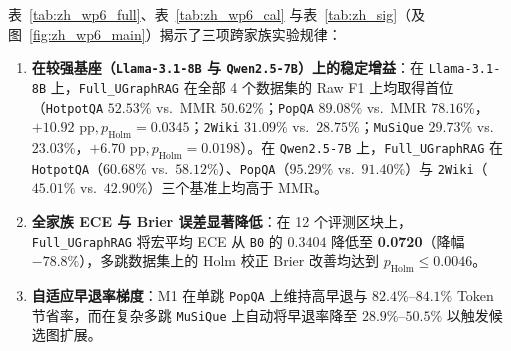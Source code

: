 \documentclass[11pt]{article}
\begin{document}
表~\ref{tab:zh_wp6_full}、表~\ref{tab:zh_wp6_cal} 与表~\ref{tab:zh_sig}（及图~\ref{fig:zh_wp6_main}）揭示了三项跨家族实验规律：
\begin{enumerate}[leftmargin=*,nosep]
    \item \textbf{在较强基座（\texttt{Llama-3.1-8B} 与 \texttt{Qwen2.5-7B}）上的稳定增益}：在 \texttt{Llama-3.1-8B} 上，\texttt{Full\_UGraphRAG} 在全部 4 个数据集的 Raw F1 上均取得首位（\texttt{HotpotQA} $52.53\%$ vs.\ MMR $50.62\%$；\texttt{PopQA} $89.08\%$ vs.\ MMR $78.16\%$，$+10.92\text{ pp}, p_{\text{Holm}}=0.0345$；\texttt{2Wiki} $31.09\%$ vs.\ $28.75\%$；\texttt{MuSiQue} $29.73\%$ vs.\ $23.03\%$，$+6.70\text{ pp}, p_{\text{Holm}}=0.0198$）。在 \texttt{Qwen2.5-7B} 上，\texttt{Full\_UGraphRAG} 在 \texttt{HotpotQA}（$60.68\%$ vs.\ $58.12\%$）、\texttt{PopQA}（$95.29\%$ vs.\ $91.40\%$）与 \texttt{2Wiki}（$45.01\%$ vs.\ $42.90\%$）三个基准上均高于 MMR。
    \item \textbf{全家族 ECE 与 Brier 误差显著降低}：在 12 个评测区块上，\texttt{Full\_UGraphRAG} 将宏平均 ECE 从 \texttt{B0} 的 $0.3404$ 降低至 \textbf{0.0720}（降幅 $-78.8\%$），多跳数据集上的 Holm 校正 Brier 改善均达到 $p_{\text{Holm}} \le 0.0046$。
    \item \textbf{自适应早退率梯度}：M1 在单跳 \texttt{PopQA} 上维持高早退与 $82.4\%\text{--}84.1\%$ Token 节省率，而在复杂多跳 \texttt{MuSiQue} 上自动将早退率降至 $28.9\%\text{--}50.5\%$ 以触发候选图扩展。
\end{enumerate}
\end{document}
